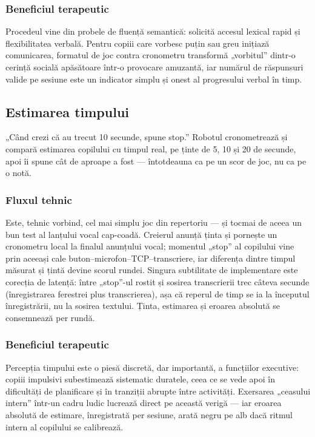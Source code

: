 \subsubsection*{Beneficiul terapeutic}
Procedeul vine din probele de fluență semantică: solicită accesul lexical rapid și flexibilitatea verbală. Pentru copiii care vorbesc puțin sau greu inițiază comunicarea, formatul de joc contra cronometru transformă „vorbitul” dintr-o cerință socială apăsătoare într-o provocare amuzantă, iar numărul de răspunsuri valide pe sesiune este un indicator simplu și onest al progresului verbal în timp.

\subsection{Estimarea timpului}

„Când crezi că au trecut 10 secunde, spune stop.” Robotul cronometrează și compară estimarea copilului cu timpul real, pe ținte de 5, 10 și 20 de secunde, apoi îi spune cât de aproape a fost — întotdeauna ca pe un scor de joc, nu ca pe o notă.

\subsubsection*{Fluxul tehnic}
Este, tehnic vorbind, cel mai simplu joc din repertoriu — și tocmai de aceea un bun test al lanțului vocal cap-coadă. Creierul anunță ținta și pornește un cronometru local la finalul anunțului vocal; momentul „stop” al copilului vine prin aceeași cale buton--microfon--TCP--transcriere, iar diferența dintre timpul măsurat și țintă devine scorul rundei. Singura subtilitate de implementare este corecția de latență: între „stop”-ul rostit și sosirea transcrierii trec câteva secunde (înregistrarea ferestrei plus transcrierea), așa că reperul de timp se ia la începutul înregistrării, nu la sosirea textului. Ținta, estimarea și eroarea absolută se consemnează per rundă.

\subsubsection*{Beneficiul terapeutic}
Percepția timpului este o piesă discretă, dar importantă, a funcțiilor executive: copiii impulsivi subestimează sistematic duratele, ceea ce se vede apoi în dificultăți de planificare și în tranziții abrupte între activități. Exersarea „ceasului intern” într-un cadru ludic lucrează direct pe această verigă — iar eroarea absolută de estimare, înregistrată per sesiune, arată negru pe alb dacă ritmul intern al copilului se calibrează.

